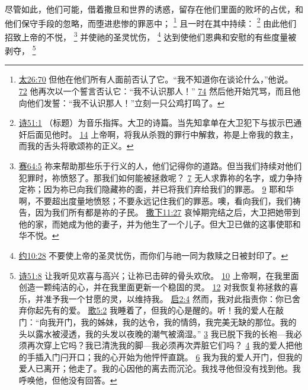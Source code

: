 \documentclass[12pt, a4paper, oneside]{ctexart}
\newcounter{parnum}[section]
\newcommand{\N}{%
   \noindent\refstepcounter{parnum}%
    \makebox[\parindent][l]{\textbf{\arabic{parnum}.}}}
\begin{document}
\N 尽管如此，他们可能，借着撒旦和世界的诱惑，留存在他们里面的败坏的占优，和他们保守手段的忽略，而堕进悲惨的罪恶中；
	\footnote {
		\href{https://biblehub.com/matthew/26-70.htm}{太26:70} 但他在他们所有人面前否认了它。“我不知道你在谈论什么，”他说。
		\href{https://biblehub.com/matthew/26-72.htm}{72} 他再次以一个誓言否认它：“我不认识那人！”
		\href{https://biblehub.com/matthew/26-74.htm}{74} 然后他开始咒骂，而且他向他们发誓：“我不认识那人！”立刻一只公鸡打鸣了。
	}
	且一时在其中持续：
	\footnote {
		\href{https://biblehub.com/psalms/51-1.htm}{诗51:1} （标题）为音乐指挥。大卫的诗篇。当先知拿单在大卫犯下与拔示巴通奸后面见他时。
		\href{https://biblehub.com/psalms/51-14.htm}{14} 上帝啊，将我从杀戮的罪行中解救，祢是上帝我的救主，而我的舌头将歌颂祢的正义。
	}
	由此他们招致上帝的不悦，
	\footnote {
		\href{https://biblehub.com/isaiah/64-5.htm}{赛64:5} 祢来帮助那些乐于行义的人，他们记得你的道路。但当我们持续对他们犯罪时，祢愤怒了。那我们如何能被拯救呢？
		\href{https://biblehub.com/isaiah/64-7.htm}{7} 无人求靠祢的名字，或力争持定祢；因为祢已向我们隐藏祢的面，并已将我们弃给我们的罪恶。
		\href{https://biblehub.com/isaiah/64-9.htm}{9} 耶和华啊，不要超出度量地愤怒；不要永远记住我们的罪恶。噢，看向我们，我们祷告，因为我们所有都是祢的子民。
		\href{https://biblehub.com/2_samuel/11-27.htm}{撒下11:27} 哀悼期完结之后，大卫把她带到他的家，而她成为他的妻子，并为他生了一个儿子。但大卫已做的这事使耶和华不悦。
	}
	并使祂的圣灵忧伤，
	\footnote {
		\href{https://biblehub.com/ephesians/4-30.htm}{约10:28} 不要使上帝的圣灵忧伤，而你们与祂一同为救赎之日被封印了。
	}
	达到使他们恩典和安慰的有些度量被剥夺，
	\footnote {
		\href{https://biblehub.com/psalms/51-8.htm}{诗51:8} 让我听见欢喜与高兴；让祢已击碎的骨头欢欣。
		\href{https://biblehub.com/psalms/51-10.htm}{10} 上帝啊，在我里面创造一颗纯洁的心，并在我里面更新一个稳固的灵。
		\href{https://biblehub.com/psalms/51-12.htm}{12} 对我恢复祢拯救的喜乐，并准予我一个甘愿的灵，以维持我。
		\href{https://biblehub.com/revelation/2-4.htm}{启2:4} 然而，我对此指责你：你已舍弃你起先有的爱。
		\href{https://biblehub.com/songs/5-2.htm}{歌5:2} 我睡着了，但我的心是醒的。听！我的爱人在敲门：“向我开门，我的姊妹，我的达令，我的情鸽，我完美无缺的那位。我的头以露水被浸透，我的头发以夜晚的潮气被滴湿。”
		\href{https://biblehub.com/songs/5-3.htm}{3} 我已脱下我的长袍---我必须再次穿上它吗？我已清洗我的脚---我必须再次弄脏它们吗？
		\href{https://biblehub.com/songs/5-4.htm}{4} 我的爱人把他的手插入门闩开口；我的心开始为他怦怦直跳。
		\href{https://biblehub.com/songs/5-6.htm}{6} 我为我的爱人开门，但我的爱人已离开；他走了。我的心因他的离去而沉沦。我找寻他但没有找到他。我呼唤他，但他没有回答。
	}
\end{document}
